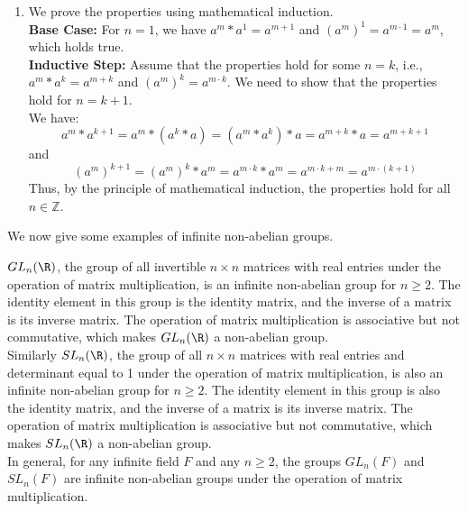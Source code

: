 \documentclass[openany]{book}
\begin{document}
\begin{enumerate}
    Now, let $a, b \in G$. We want to show that $(a * b)^{-1} = b^{-1} * a^{-1}$. By the definition of inverse element, we have:
    \[(a * b) * (b^{-1} * a^{-1}) = a * (b * b^{-1}) * a^{-1} = a * e * a^{-1} = a * a^{-1} = e\]
    Similarly, we can show that \((b^{-1} * a^{-1}) * (a * b) = e\). Thus, we have shown that \((a * b)^{-1} = b^{-1} * a^{-1}\) for all \(a, b \in G\).
    \item We prove the properties using mathematical induction. \\
    \textbf{Base Case:} For \( n = 1 \), we have \( a^m * a^1 = a^{m+1} \) and \( (a^m)^1 = a^{m \cdot 1} = a^m \), which holds true. \\
    \textbf{Inductive Step:} Assume that the properties hold for some \( n = k \), i.e., \( a^m * a^k = a^{m+k} \) and \( (a^m)^k = a^{m \cdot k} \). We need to show that the properties hold for \( n = k + 1 \). \\
    We have:
    \[a^m * a^{k+1} = a^m * (a^k * a) = (a^m * a^k) * a = a^{m+k} * a = a^{m+k+1}\]
    and
    \[(a^m)^{k+1} = (a^m)^k * a^m = a^{m \cdot k} * a^m = a^{m \cdot k + m} = a^{m \cdot (k + 1)}\]
    Thus, by the principle of mathematical induction, the properties hold for all \( n \in \mathbb{Z} \).
    
\end{enumerate}
We now give some examples of infinite non-abelian groups. \\
\begin{example}
    $GL_n(\R)$, the group of all invertible $n \times n$ matrices with real entries under the operation of matrix multiplication, is an infinite non-abelian group for \( n \geq 2 \). The identity element in this group is the identity matrix, and the inverse of a matrix is its inverse matrix. The operation of matrix multiplication is associative but not commutative, which makes \( GL_n(\R) \) a non-abelian group. \\
    Similarly $SL_n(\R)$, the group of all $n \times n$ matrices with real entries and determinant equal to 1 under the operation of matrix multiplication, is also an infinite non-abelian group for \( n \geq 2 \). The identity element in this group is also the identity matrix, and the inverse of a matrix is its inverse matrix. The operation of matrix multiplication is associative but not commutative, which makes \( SL_n(\R) \) a non-abelian group. \\
    In general, for any infinite field \( F \) and any \( n \geq 2 \), the groups \( GL_n(F) \) and \( SL_n(F) \) are infinite non-abelian groups under the operation of matrix multiplication.
\end{example} 
\end{document}

